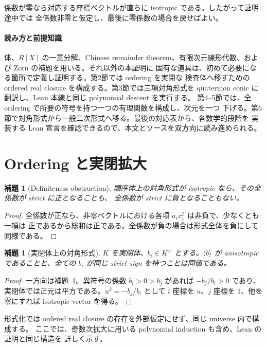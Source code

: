 \documentclass[uplatex,dvipdfmx]{jsarticle}
\newtheorem{lemma}[theorem]{補題}
\theoremstyle{definition}
\theoremstyle{remark}
\begin{document}
係数が零なら対応する座標ベクトルが直ちに isotropic である。したがって証明途中では
全係数非零と仮定し、最後に零係数の場合を戻せばよい。

\paragraph{読み方と前提知識}
体、$R[X]$ の一意分解、Chinese remainder theorem、有限次元線形代数、および
Zorn の補題を用いる。それ以外の本証明に
固有な道具は、初めて必要になる箇所で定義し証明する。第2節では ordering を実閉な
検査体へ移すための ordered real closure を構成する。第3節では三項対角形式を
quaternion conic に翻訳し、Lean 本線と同じ polynomial descent を実行する。
第4--5節では、全 ordering で所要の符号を持つ一つの有理関数を構成し、次元を一つ
下げる。第6節で対角形式から一般二次形式へ移る。最後の対応表から、各数学的段階を
実装する Lean 宣言を確認できるので、本文とソースを双方向に読み進められる。

\section{Ordering と実閉拡大}

\begin{lemma}[Definiteness obstruction]\label{lem:definite-ja}
順序体上の対角形式が isotropic なら、その全係数が strict に正となることも、
全係数が strict に負となることもない。
\end{lemma}
\begin{proof}
全係数が正なら、非零ベクトルにおける各項 $a_ix_i^2$ は非負で、少なくとも一項は
正であるから総和は正である。全係数が負の場合は形式全体を負にして同様である。
\end{proof}

\begin{lemma}[実閉体上の対角形式]\label{lem:rcdiag-ja}
$K$ を実閉体、$b_i\in K^\times$ とする。$\langle b\rangle$ が
anisotropic であることと、全ての $b_i$ が同じ strict sign を持つことは同値である。
\end{lemma}
\begin{proof}
一方向は補題~\ref{lem:definite-ja}。異符号の係数 $b_i>0>b_j$ があれば
$-b_j/b_i>0$ であり、実閉体では正元は平方である。$u^2=-b_j/b_i$ として
$i$ 座標を $u$、$j$ 座標を $1$、他を零にすれば isotropic vector を得る。
\end{proof}

形式化では ordered real closure の存在を外部仮定にせず、同じ universe 内で構成する。
ここでは、奇数次拡大に用いる polynomial induction も含め、Lean の証明と同じ構造を
詳しく示す。
\end{document}
